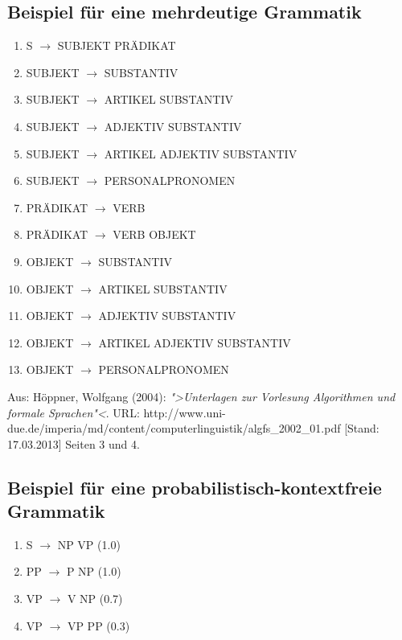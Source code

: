 \documentclass[12pt,a4paper]{article}
\theoremstyle{definition}
\begin{document}
	\subsection{Beispiel für eine mehrdeutige Grammatik}
		
		\begin{enumerate}[label={(\arabic*)}]
			\item{S $\rightarrow$ SUBJEKT PRÄDIKAT}
			\item{SUBJEKT $\rightarrow$ SUBSTANTIV}
			\item{SUBJEKT $\rightarrow$ ARTIKEL SUBSTANTIV}
			\item{SUBJEKT $\rightarrow$ ADJEKTIV SUBSTANTIV}
			\item{SUBJEKT $\rightarrow$ ARTIKEL ADJEKTIV SUBSTANTIV}
			\item{SUBJEKT $\rightarrow$ PERSONALPRONOMEN}
			\item{PRÄDIKAT $\rightarrow$ VERB}
			\item{PRÄDIKAT $\rightarrow$ VERB OBJEKT}
			\item{OBJEKT $\rightarrow$ SUBSTANTIV}
			\item{OBJEKT $\rightarrow$ ARTIKEL SUBSTANTIV}
			\item{OBJEKT $\rightarrow$ ADJEKTIV SUBSTANTIV}
			\item{OBJEKT $\rightarrow$ ARTIKEL ADJEKTIV SUBSTANTIV}
			\item{OBJEKT $\rightarrow$ PERSONALPRONOMEN}
		\end{enumerate}
		
		Aus: Höppner, Wolfgang (2004): \emph{">Unterlagen zur Vorlesung Algorithmen und formale Sprachen"<}.
			 URL: http://www.uni-due.de/imperia/md/content/computerlinguistik/algfs\_2002\_01.pdf [Stand: 17.03.2013]
			 Seiten 3 und 4.

	\subsection{Beispiel für eine probabilistisch-kontextfreie Grammatik}
	
		\begin{enumerate}[label={(\arabic*)}]
			\item{S $\rightarrow$ NP VP  (1.0)}
			\item{PP $\rightarrow$ P NP  (1.0)}
			\item{VP $\rightarrow$ V NP  (0.7)}
			\item{VP $\rightarrow$ VP PP (0.3)}
		\end{enumerate}
	
\end{document}
